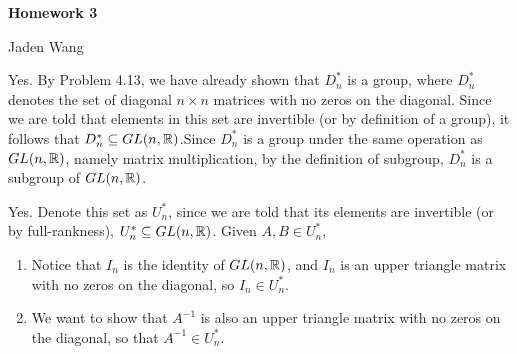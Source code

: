 \documentclass[12pt]{article}
\begin{document}
\centerline {\textsf{\textbf{\LARGE{Homework 3}}}}
\centerline {Jaden Wang}
\vspace{.15in}

\begin{problem}[5.9]
	Yes. By Problem 4.13, we have already shown that $D_n^* $ is a group, where $D_n^* $ denotes the set of diagonal $n\times n$ matrices with no zeros on the diagonal. Since we are told that elements in this set are invertible (or by definition of a group), it follows that $D_n^* \subseteq GL(n, \mathbb{R})$.Since $D_n^* $ is a group under the same operation as $GL(n, \mathbb{R})$, namely matrix multiplication, by the definition of subgroup, $D_n^* $ is a subgroup of $GL(n, \mathbb{R})$.
\end{problem}

\begin{problem}[5.10]
	Yes. Denote this set as $U_n^* $, since we are told that its elements are invertible (or by full-rankness), $U_n^* \subseteq GL(n, \mathbb{R})$. Given $A,B \in U_n^* $,
	\begin{enumerate}[label=(\roman*)]
		\item Notice that $I_n$ is the identity of $GL(n, \mathbb{R})$, and $I_n$ is an upper triangle matrix with no zeros on the diagonal, so $I_n \in U_n^* $.
		\item We want to show that $A^{-1}$ is also an upper triangle matrix with no zeros on the diagonal, so that $A^{-1} \in U_n^* $. 


\end{enumerate}
\end{problem}
\end{document}
